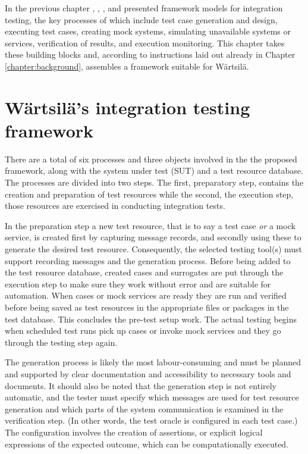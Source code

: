 \documentclass[12pt,a4paper,oneside,pdftex]{report}
\begin{document}
{In the previous chapter \citet{fewster1999software}, \citet{huang2008surrogate}, \citet{liu2009unified}, and \citet{laukkanen2006data} presented framework models for integration testing, the key processes of which include test case generation and design, executing test cases, creating mock systems, simulating unavailable systems or services, verification of results, and execution monitoring. This chapter takes these building blocks and, according to instructions laid out already in Chapter \ref{chapter:background}, assembles a framework suitable for Wärtsilä.

\section{Wärtsilä's integration testing framework}

There are a total of six processes and three objects involved in the the proposed framework, along with the system under test (SUT) and a test resource database. The processes are divided into two steps. The first, preparatory step, contains the creation and preparation of test resources while the second, the execution step, those resources are exercised in conducting integration tests.

In the preparation step a new test resource, that is to say a test case \emph{or} a mock service, is created first by capturing message records, and secondly using these to generate the desired test resource. Consequently, 
the selected testing tool(s) must support recording messages and the generation process. Before being added to the test resource database, created cases and surrogates are put through the execution step to make sure they work without error and are suitable for automation. When cases or mock services are ready they are run and verified before being saved as test resources in the appropriate files or packages in the test database. This concludes the pre-test setup work. The actual testing begins when scheduled test runs pick up cases or invoke mock services and they go through the testing step again.

The generation process is likely the most labour-consuming and must be planned and supported by clear documentation and accessibility to necessary tools and documents. It should also be noted that the generation step is not entirely automatic, and the tester must specify which messages are used for test resource generation and which parts of the system communication is examined in the verification step. (In other words, the test oracle is configured in each test case.) The configuration involves the creation of assertions, or explicit logical expressions of the expected outcome, which can be computationally executed. 

}
\end{document}
